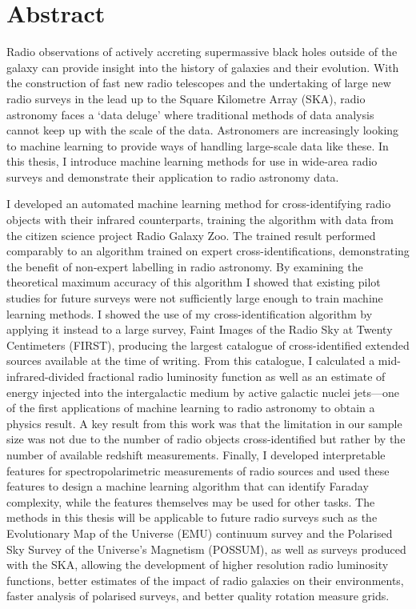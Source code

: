 \chapter*{Abstract}
\vspace{-1em}

Radio observations of actively accreting supermassive black holes outside of the galaxy can provide insight into the history of galaxies and their evolution. With the construction of fast new radio telescopes and the undertaking of large new radio surveys in the lead up to the Square Kilometre Array (SKA), radio astronomy faces a `data deluge' where traditional methods of data analysis cannot keep up with the scale of the data. Astronomers are increasingly looking to machine learning to provide ways of handling large-scale data like these. In this thesis, I introduce machine learning methods for use in wide-area radio surveys and demonstrate their application to radio astronomy data.

I developed an automated machine learning method for cross-identifying radio objects with their infrared counterparts, training the algorithm with data from the citizen science project Radio Galaxy Zoo. The trained result performed comparably to an algorithm trained on expert cross-identifications, demonstrating the benefit of non-expert labelling in radio astronomy. By examining the theoretical maximum accuracy of this algorithm I showed that existing pilot studies for future surveys were not sufficiently large enough to train machine learning methods. I showed the use of my cross-identification algorithm by applying it instead to a large survey, Faint Images of the Radio Sky at Twenty Centimeters (FIRST), producing the largest catalogue of cross-identified extended sources available at the time of writing. From this catalogue, I calculated a mid-infrared-divided fractional radio luminosity function as well as an estimate of energy injected into the intergalactic medium by active galactic nuclei jets---one of the first applications of machine learning to radio astronomy to obtain a physics result. A key result from this work was that the limitation in our sample size was not due to the number of radio objects cross-identified but rather by the number of available redshift measurements. Finally, I developed interpretable features for spectropolarimetric measurements of radio sources and used these features to design a machine learning algorithm that can identify Faraday complexity, while the features themselves may be used for other tasks. The methods in this thesis will be applicable to future radio surveys such as the Evolutionary Map of the Universe (EMU) continuum survey and the Polarised Sky Survey of the Universe's Magnetism (POSSUM), as well as surveys produced with the SKA, allowing the development of higher resolution radio luminosity functions, better estimates of the impact of radio galaxies on their environments, faster analysis of polarised surveys, and better quality rotation measure grids.


